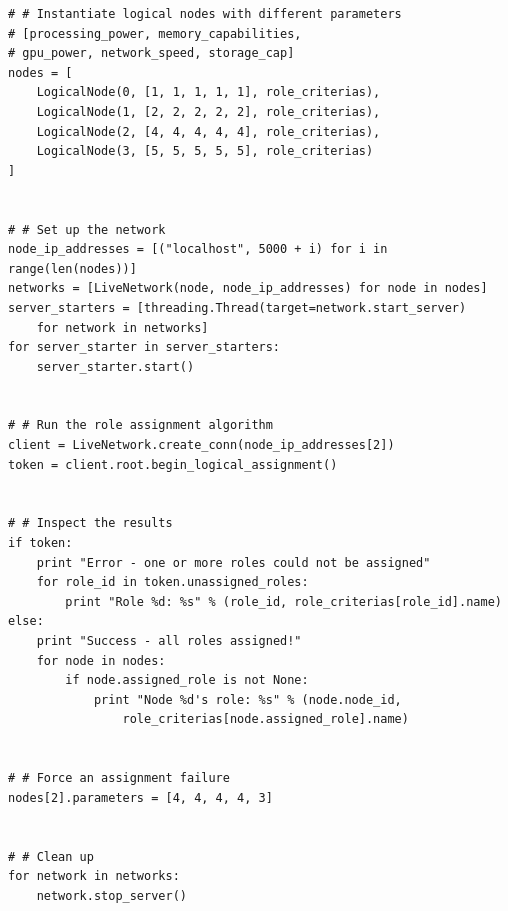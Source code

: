 \documentclass[11pt]{article}
\begin{document}
\begin{lstlisting}
# # Instantiate logical nodes with different parameters
# [processing_power, memory_capabilities, 
# gpu_power, network_speed, storage_cap]
nodes = [
    LogicalNode(0, [1, 1, 1, 1, 1], role_criterias),
    LogicalNode(1, [2, 2, 2, 2, 2], role_criterias),
    LogicalNode(2, [4, 4, 4, 4, 4], role_criterias),
    LogicalNode(3, [5, 5, 5, 5, 5], role_criterias)
]


# # Set up the network
node_ip_addresses = [("localhost", 5000 + i) for i in range(len(nodes))]
networks = [LiveNetwork(node, node_ip_addresses) for node in nodes]
server_starters = [threading.Thread(target=network.start_server) 
	for network in networks]
for server_starter in server_starters:
    server_starter.start()


# # Run the role assignment algorithm
client = LiveNetwork.create_conn(node_ip_addresses[2])
token = client.root.begin_logical_assignment()


# # Inspect the results
if token:
    print "Error - one or more roles could not be assigned"
    for role_id in token.unassigned_roles:
        print "Role %d: %s" % (role_id, role_criterias[role_id].name)
else:
    print "Success - all roles assigned!"
    for node in nodes:
        if node.assigned_role is not None:
            print "Node %d's role: %s" % (node.node_id, 
            	role_criterias[node.assigned_role].name)


# # Force an assignment failure
nodes[2].parameters = [4, 4, 4, 4, 3]


# # Clean up
for network in networks:
    network.stop_server()


\end{lstlisting}
\end{document}
